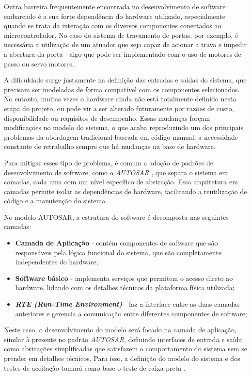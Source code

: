 Outra barreira frequentemente  encontrada no desenvolvimento de software embarcado é a sua forte dependência do hardware utilizado, especialmente quando se trata 
da interação com os diversos componentes conectados ao microcontrolador. No caso do sistema de travamento de portas, por exemplo, é necessária a utilização de um 
atuador que seja capaz de acionar a trava e impedir a abertura da porta - algo que pode ser implementado com o uso de motores de passo ou servo motores.

A dificuldade surge justamente na definição das entradas e saídas do sistema, que precisam ser modeladas de forma compatível com os componentes selecionados. No 
entanto, muitas vezes o hardware ainda não está totalmente definido nesta etapa do projeto, ou pode vir a ser alterado futuramente por razões de custo, 
disponibilidade ou requisitos de desempenho. Essas mudanças forçam modificações no modelo do sistema, o que acaba reproduzindo um dos principais problemas da 
abordagem tradicional baseada em código manual: a necessidade constante de retrabalho sempre que há mudanças na base de hardware.

Para mitigar esses tipo de problema, é comum a adoção de padrões de desenvolvimento de software, como o \textit{AUTOSAR} \cite{autosarClassic}, que separa o sistema em 
camadas, cada uma com um nível específico de abstração. Essa arquitetura em camadas permite isolar as dependências de hardware, facilitando a reutilização de 
código e a manutenção do sistema. 

No modelo AUTOSAR, a estrutura do software é decomposta nas seguintes camadas:

\begin{itemize}
	\item \textbf{Camada de Aplicação} - contém componentes de software que são responsáveis pela lógica funcional do sistema, que são completamente independentes do hardware;
	\item \textbf{Software básico} - implementa serviços que permitem o acesso direto ao hardware, lidando com os detalhes técnicos da plataforma física utilizada;
	\item \textbf{\textit{RTE (Run-Time Environment)}} - faz a interface entre as duas camadas anteriores e gerencia a comunicação entre diferentes componentes de software;
\end{itemize}

Neste caso, o desenvolvimento do modelo será focado na camada de aplicação, similar à presente no padrão \textit{AUTOSAR}, definindo interfaces de entrada e saída como 
abstrações simplificadas que satisfazem o comportamento do sistema sem se prender em detalhes técnicos. Para isso, a definição do modelo do sistema e dos testes 
de aceitação tomará como base o teste de caixa preta \cite{sommerville2019}.

